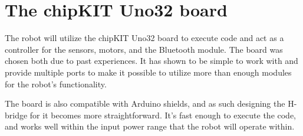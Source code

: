 



\section{The chipKIT Uno32 board}
The robot will utilize the chipKIT Uno32 board to execute code and act as a controller for the sensors, motors, and the Bluetooth module. The board
was chosen both due to past experiences. It has shown to be simple to work with and provide multiple ports to make it possible to utilize more than enough modules for the robot's functionality.

The board is also compatible with Arduino shields, and as such designing the H-bridge for it becomes more straightforward. It's fast enough to execute the code, and works well within the input power range that the robot will operate within.


